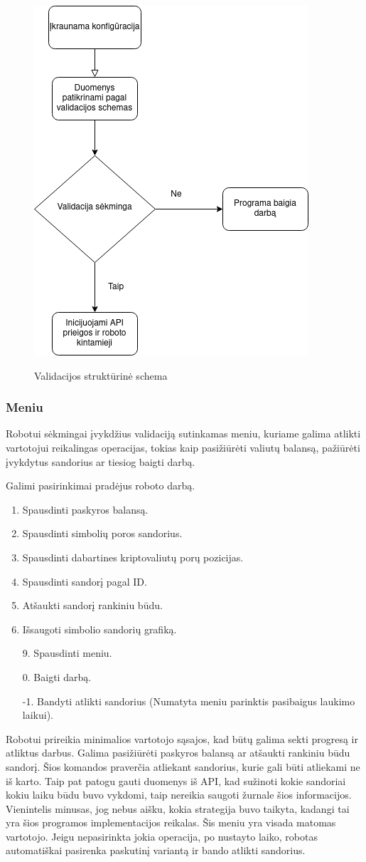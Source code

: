 \documentclass{VUMIFInfKursinis}
\begin{document}
\begin{figure}[H]
  \centering
  \includegraphics[width=.5\textwidth]{img/validacija.png}
  \label{fig:validation_flowchat}
  \caption{Validacijos struktūrinė schema}
\end{figure}


\subsubsection{Meniu}
Robotui sėkmingai įvykdžius validaciją sutinkamas meniu, kuriame galima atlikti vartotojui reikalingas operacijas, tokias kaip pasižiūrėti valiutų balansą,
pažiūrėti įvykdytus sandorius ar tiesiog baigti darbą.

Galimi pasirinkimai pradėjus roboto darbą.
\begin{enumerate}
  \item Spausdinti paskyros balansą.
  \item Spausdinti simbolių poros sandorius.
  \item Spausdinti dabartines kriptovaliutų porų pozicijas.
  \item Spausdinti sandorį pagal ID.
  \item Atšaukti sandorį rankiniu būdu.
  \item Išsaugoti simbolio sandorių grafiką.
  \item[9.] Spausdinti meniu.
  \item[0.] Baigti darbą.
  \item[-1.] Bandyti atlikti sandorius (Numatyta meniu parinktis pasibaigus laukimo laikui).
\end{enumerate}

Robotui prireikia minimalios vartotojo sąsajos, kad būtų galima sekti progresą ir atliktus darbus.
Galima pasižiūrėti paskyros balansą ar atšaukti rankiniu būdu sandorį. Šios komandos praverčia atliekant sandorius, kurie gali būti atliekami ne iš karto. Taip pat patogu
gauti duomenys iš API, kad sužinoti kokie sandoriai kokiu laiku būdu buvo vykdomi, taip nereikia saugoti žurnale šios informacijos. Vienintelis minusas, jog nebus aišku,
kokia strategija buvo taikyta, kadangi tai yra šios programos implementacijos reikalas. Šis meniu yra visada matomas vartotojo. 
Jeigu nepasirinkta jokia operacija, po nustayto laiko, robotas automatiškai pasirenka paskutinį variantą ir bando atlikti sandorius.
\end{document}
